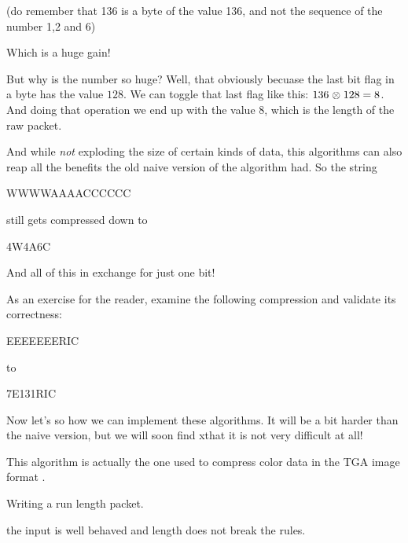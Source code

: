 \begin{refsection}
(do remember that 136 is a byte of the value 136, and not the sequence
of the number 1,2 and 6)

Which is a huge gain!

But why is the number so huge? Well, that obviously becuase the last
bit flag in a byte has the value $128$. We can toggle that last flag
like this: $136 \mathrel{\otimes} 128 = 8$. And doing that operation we end up with
the value $8$, which is the length of the raw packet.


And while \textit{not} exploding the size of certain kinds of data,
this algorithms can also reap all the benefits the old naive version
of the algorithm had. So the string

\begin{indentpar}
  WWWWAAAACCCCCC
\end{indentpar}

still gets compressed down to

\begin{indentpar}
  4W4A6C
\end{indentpar}

And all of this in exchange for just one bit!

As an exercise for the reader, examine the following compression and
validate its correctness:

\begin{indentpar}
  EEEEEEERIC
\end{indentpar}

to

\begin{indentpar}
  7E131RIC
\end{indentpar}

Now let's so how we can implement these algorithms. It will be a bit
harder than the naive version, but we will soon find xthat it is not very
difficult at all!

This algorithm is actually the one used to compress color data in the
TGA image format \cite{91:_truev_tga_file_format_specif}.

\begin{algorithm}[h]
  \caption{Writing a run length packet.}
  \label{alg:rle-packet}
  \begin{algorithmic}[1]
    \Require the input is well behaved and length does not break the rules.
      \State {}
      \State {}
    \EndFunction
  \end{algorithmic}
\end{algorithm}


\printbibliography[heading=subbibliography]

\end{refsection}
